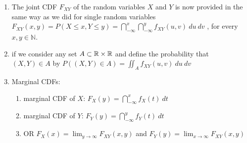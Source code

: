\begin{enumerate}
    \item The joint CDF $F _{X Y}$ of the random variables $X$ and $Y$ is now provided in the same way as we did for single random variables
    $
        F _{X Y} (x, y)
        = P(X \leq x, Y \leq y)
        = \dint^x _{-\infty} \dint^y _{-\infty} f _{X Y} (u, v)\ du \ dv
    $
    , for every $x, y \in \mathbb{N}$.
    \hfill \cite{statistics/book/Statistics-for-Data-Scientists/Maurits-Kaptein}

    \item if we consider any set $A \subset \mathbb{R} \times \mathbb{R}$ and define the probability that $(X, Y ) \in A$ by $P ((X, Y ) \in A) = \displaystyle \iint_A f _{X Y} (u, v)\ du\ dv$
    \hfill \cite{statistics/book/Statistics-for-Data-Scientists/Maurits-Kaptein}

    \item Marginal CDFs:
    \begin{enumerate}
        \item marginal CDF of $X$: $F _X (y) = \dint^x _{-\infty} f _{X} (t)\ dt$
        \hfill \cite{statistics/book/Statistics-for-Data-Scientists/Maurits-Kaptein}

        \item marginal CDF of $Y$: $F _Y (y) = \dint^y _{-\infty} f _{Y} (t)\ dt$
        \hfill \cite{statistics/book/Statistics-for-Data-Scientists/Maurits-Kaptein}

        \item OR ${\displaystyle F_X (x) = \lim _{y\to\infty} F_{X Y} (x, y)}$ and ${\displaystyle F_Y (y) = \lim_{x\to\infty} F _{X Y} (x, y)}$
        \hfill \cite{statistics/book/Statistics-for-Data-Scientists/Maurits-Kaptein}
    \end{enumerate}

\end{enumerate}



































